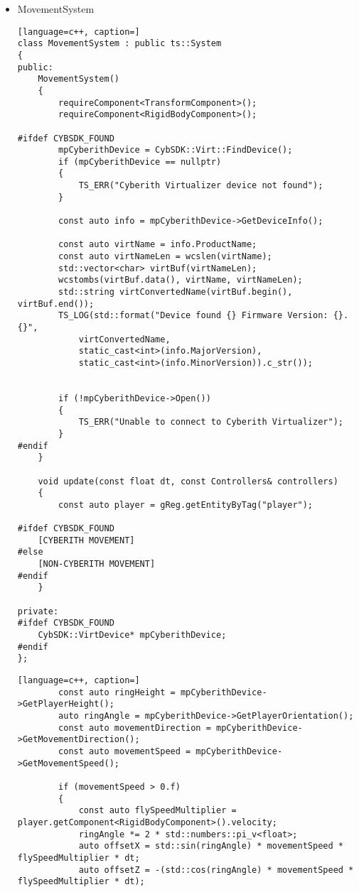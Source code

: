 \begin{itemize}
    \item MovementSystem
    \label{sec:movement_system}
\begin{lstlisting}[language=c++, caption=]
class MovementSystem : public ts::System
{
public:
    MovementSystem()
    {
        requireComponent<TransformComponent>();
        requireComponent<RigidBodyComponent>();

#ifdef CYBSDK_FOUND
        mpCyberithDevice = CybSDK::Virt::FindDevice();
        if (mpCyberithDevice == nullptr)
        {
            TS_ERR("Cyberith Virtualizer device not found");
        }

        const auto info = mpCyberithDevice->GetDeviceInfo();

        const auto virtName = info.ProductName;
        const auto virtNameLen = wcslen(virtName);
        std::vector<char> virtBuf(virtNameLen);
        wcstombs(virtBuf.data(), virtName, virtNameLen);
        std::string virtConvertedName(virtBuf.begin(), virtBuf.end());
        TS_LOG(std::format("Device found {} Firmware Version: {}.{}",
            virtConvertedName,
            static_cast<int>(info.MajorVersion),
            static_cast<int>(info.MinorVersion)).c_str());


        if (!mpCyberithDevice->Open())
        {
            TS_ERR("Unable to connect to Cyberith Virtualizer");
        }
#endif
    }

    void update(const float dt, const Controllers& controllers)
    {
        const auto player = gReg.getEntityByTag("player");

#ifdef CYBSDK_FOUND
    [CYBERITH MOVEMENT]
#else
    [NON-CYBERITH MOVEMENT]
#endif
    }

private:
#ifdef CYBSDK_FOUND
    CybSDK::VirtDevice* mpCyberithDevice;
#endif
};
\end{lstlisting}
\begin{lstlisting}[language=c++, caption=]
        const auto ringHeight = mpCyberithDevice->GetPlayerHeight();
        auto ringAngle = mpCyberithDevice->GetPlayerOrientation();
        const auto movementDirection = mpCyberithDevice->GetMovementDirection();
        const auto movementSpeed = mpCyberithDevice->GetMovementSpeed();

        if (movementSpeed > 0.f)
        {
            const auto flySpeedMultiplier = player.getComponent<RigidBodyComponent>().velocity;
            ringAngle *= 2 * std::numbers::pi_v<float>;
            auto offsetX = std::sin(ringAngle) * movementSpeed * flySpeedMultiplier * dt;
            auto offsetZ = -(std::cos(ringAngle) * movementSpeed * flySpeedMultiplier * dt);


\end{lstlisting}
\end{itemize}
